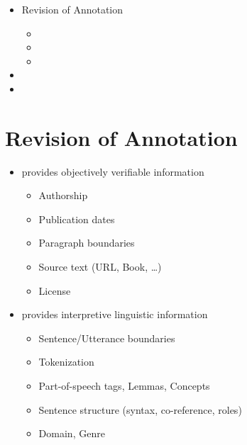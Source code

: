 \documentclass[a4paper,landscape,headrule,footrule,xetex]{foils}
\begin{document}

\maketitle



\begin{itemize} 
\item Revision of Annotation
  \begin{itemize}
  \item {}
  \item {}
  \item {}
  \end{itemize}
\item {}
\item {}
\end{itemize}


\section{Revision of Annotation}

  \begin{itemize}
  \item {} provides objectively verifiable information
    \begin{itemize}
    \item Authorship
    \item Publication dates
    \item Paragraph boundaries
    \item Source text (URL, Book, \ldots)
    \item License
    \end{itemize}
  \item {} provides interpretive linguistic information
    \begin{itemize}
    \item Sentence/Utterance boundaries
    \item Tokenization
    \item Part-of-speech tags, Lemmas, Concepts
    \item Sentence structure (syntax, co-reference, roles)
    \item Domain, Genre
    \end{itemize}
  \end{itemize}
\end{document}
